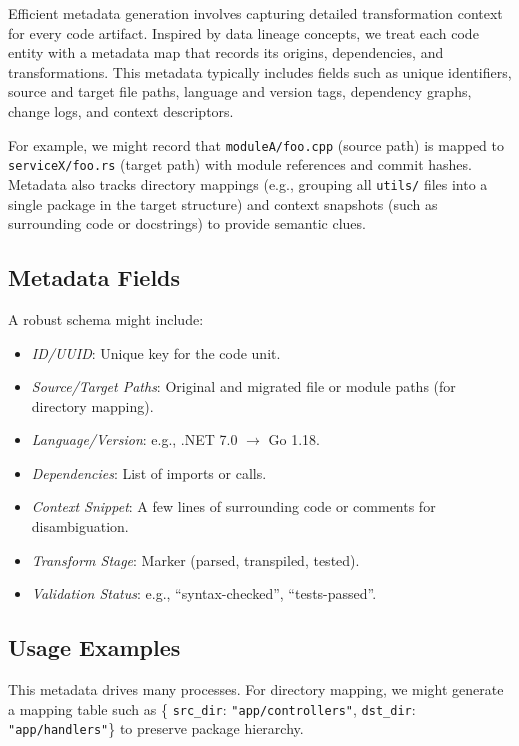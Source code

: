 \documentclass[twocolumn]{article}
\begin{document}
Efficient metadata generation involves capturing detailed transformation context for every code artifact. Inspired by data lineage concepts, we treat each code entity with a metadata map that records its origins, dependencies, and transformations. This metadata typically includes fields such as unique identifiers, source and target file paths, language and version tags, dependency graphs, change logs, and context descriptors. 

For example, we might record that \texttt{moduleA/foo.cpp} (source path) is mapped to \texttt{serviceX/foo.rs} (target path) with module references and commit hashes. Metadata also tracks directory mappings (e.g., grouping all \texttt{utils/} files into a single package in the target structure) and context snapshots (such as surrounding code or docstrings) to provide semantic clues.

\subsection*{Metadata Fields}

A robust schema might include:

\begin{itemize}
    \item \textit{ID/UUID}: Unique key for the code unit.
    \item \textit{Source/Target Paths}: Original and migrated file or module paths (for directory mapping).
    \item \textit{Language/Version}: e.g., .NET 7.0 $\rightarrow$ Go 1.18.
    \item \textit{Dependencies}: List of imports or calls.
    \item \textit{Context Snippet}: A few lines of surrounding code or comments for disambiguation.
    \item \textit{Transform Stage}: Marker (parsed, transpiled, tested).
    \item \textit{Validation Status}: e.g., ``syntax-checked'', ``tests-passed''.
\end{itemize}

\subsection*{Usage Examples}

This metadata drives many processes. For directory mapping, we might generate a mapping table such as \{ \texttt{src\_dir}: \texttt{"app/controllers"}, \texttt{dst\_dir}: \texttt{"app/handlers"}\} to preserve package hierarchy. 
\end{document}
